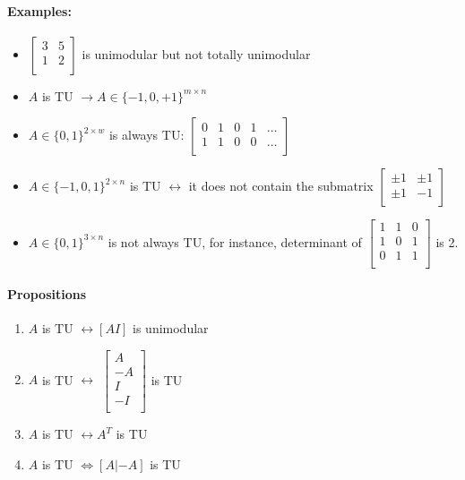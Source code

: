 \documentclass[main]{subfiles}
\begin{document}
\paragraph{Examples:}
\begin{itemize}
\itemsep0em
\item
$\begin{bmatrix}
3 & 5\\
1 & 2 \\
\end{bmatrix}$ is unimodular but not totally unimodular
\item $A$ is TU $\rightarrow A \in \{-1, 0, +1\}^{m \times n}$
\item $A \in \{0, 1\}^{2 \times w}$ is always TU: 
$\begin{bmatrix}
0 & 1 & 0 & 1 & \dots \\
1 & 1 & 0 & 0 & \dots \\
\end{bmatrix}$
\item $A \in \{-1, 0, 1\}^{2 \times n}$ is TU $\leftrightarrow$ it does not
contain the submatrix 
$\begin{bmatrix}
\pm 1 & \pm 1 \\
\pm 1 & -1  \\
\end{bmatrix}$
\item $A \in \{0,1\}^{3 \times n}$ is not always TU, for instance, determinant
of 
$\begin{bmatrix}
1 & 1 & 0 \\
1 & 0 & 1 \\
0 & 1 & 1 \\
\end{bmatrix}$ is 2.
\end{itemize}

\paragraph{Propositions}
\begin{enumerate}
\itemsep0em
\item $A$ is TU $\leftrightarrow [AI]$ is unimodular
\item $A$ is TU $\leftrightarrow$
$\begin{bmatrix}
A \\
-A \\
I \\
-I \\
\end{bmatrix}$ is TU
\item $A$ is TU $\leftrightarrow A^{T}$ is TU
\item $A$ is TU $\iff [A |-A]$ is TU
\end{enumerate}
\end{document}
